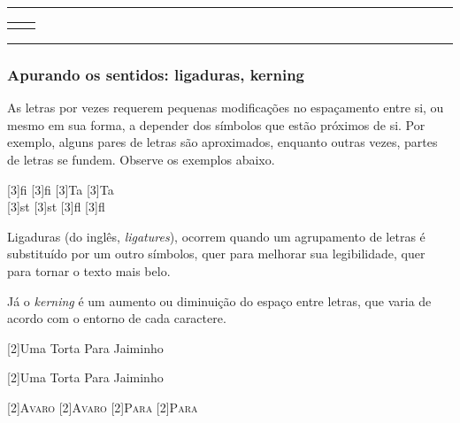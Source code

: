 \medskip
\begin{center}\footnotesize\hrule\smallskip
\begin{tabular}{c|c}
\begin{minipage}{.465\textwidth}

\end{minipage} &
\begin{minipage}{.465\textwidth}

\end{minipage}
\end{tabular}
\smallskip\hrule
\end{center}
\medskip
 
\subsubsection[Ligaduras e Kerning]{Apurando os sentidos: ligaduras, kerning}%

As letras por vezes requerem pequenas modificações no espaçamento
entre si, ou mesmo em sua forma, a depender dos símbolos que estão
próximos de si. Por exemplo, alguns pares de letras são aproximados,
enquanto outras vezes, partes de letras se fundem. Observe os exemplos
abaixo.

\medskip
\noindent\begin{center}%
\scalebox{3}[3]{f{i}}\hfil%
\scalebox{3}[3]{fi}\hfil%
\scalebox{3}[3]{T{a}}\hfil%
\scalebox{3}[3]{Ta}
\\[.9cm] 
\scalebox{3}[3]{s{t}}\hfil%
\scalebox{3}[3]{st}\hfil%
\scalebox{3}[3]{f{l}}\hfil%
\scalebox{3}[3]{fl}
\end{center}
\medskip

Ligaduras (do inglês, \emph{ligatures}), ocorrem quando um agrupamento
de letras é substituído por um outro símbolos, quer para melhorar sua
legibilidade, quer para tornar o texto mais belo.

Já o \emph{kerning} é um aumento ou diminuição do espaço entre letras,
que varia de acordo com o entorno de cada caractere.

\medskip
\noindent\begin{center}%
\scalebox{2}[2]{Uma {T}orta {P}ara {J}aiminho}

\scalebox{2}[2]{Uma Torta Para Jaiminho}

\medskip

\scalebox{2}[2]{\textsc{{A}v{a}r{o}}}\hfil%
\scalebox{2}[2]{\textsc{Avaro}}%
\hfil\scalebox{2}[2]{\textsc{{P}a{r}a}}
\hfil\scalebox{2}[2]{\textsc{Para}}\hfil
\end{center}

